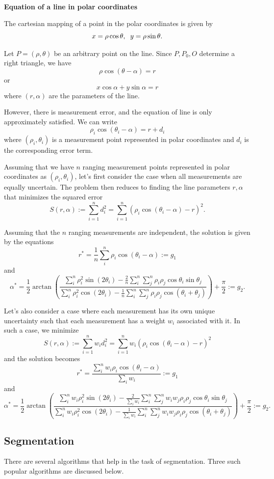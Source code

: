 \documentclass[twoside]{article}
\begin{document}
\textbf{Equation of a line in polar coordinates}

The cartesian mapping of a point in the polar coordinates is given by
$$x = \rho \cos \theta, \hspace{2mm} y = \rho \sin \theta.$$

Let $P = (\rho, \theta)$ be an arbitrary point on the line. Since $P, P_0, O$ determine a right triangle, we have
$$\rho \cos(\theta - \alpha) = r$$
or
$$x \cos \alpha + y \sin \alpha = r$$
where $(r,\alpha)$ are the parameters of the line.

However, there is measurement error, and the equation of line is only approximately satisfied. We can write
$$\rho_i \cos(\theta_i - \alpha) = r + d_i$$
where $(\rho_i, \theta_i)$ is a measurement point represented in polar coordinates and $d_i$ is the corresponding error term.

Assuming that we have $n$ ranging measurement points represented in polar coordinates as $(\rho_i, \theta_i)$, let's first consider the case when all measurements are equally uncertain. The problem then reduces to finding the line parameters $r,\alpha$ that minimizes the squared error
$$S(r,\alpha) := \sum_{i=1}^n d_i^2 = \sum_{i=1}^n(\rho_i \cos(\theta_i - \alpha) - r)^2.$$

Assuming that the $n$ ranging measurements are independent, the solution is given by the equations
$$r^* = \frac{1}{n}\sum_i^n \rho_i\cos(\theta_i - \alpha) := g_1$$ and
$$\alpha^* = \frac{1}{2} \arctan\left(\frac{\sum_i^n \rho_i^2\sin(2\theta_i) - \frac{2}{n}\sum_i^n\sum_j^n \rho_i \rho_j \cos\theta_i \sin \theta_j}{\sum_i^n \rho_i^2\cos(2\theta_i) - \frac{1}{n}\sum_i^n\sum_j^n \rho_i \rho_j \cos(\theta_i + \theta_j)}\right) + \frac{\pi}{2} := g_2.$$

Let's also consider a case where each measurement has its own unique uncertainty such that each measurement has a weight $w_i$ associated with it. In such a case, we minimize
$$S(r,\alpha) := \sum_{i=1}^n w_id_i^2 = \sum_{i=1}^n w_i(\rho_i \cos(\theta_i - \alpha) - r)^2$$
and the solution becomes \cite{SNS}
$$r^* = \frac{\sum_i^n w_i \rho_i\cos(\theta_i - \alpha)}{\sum_i w_i} := g_1$$ and
$$\alpha^* = \frac{1}{2} \arctan\left(\frac{\sum_i^n w_i \rho_i^2\sin(2\theta_i) - \frac{2}{\sum_i w_i}\sum_i^n\sum_j^n w_i w_j\rho_i \rho_j \cos\theta_i \sin \theta_j}{\sum_i^n w_i \rho_i^2\cos(2\theta_i) - \frac{1}{\sum_i w_i}\sum_i^n\sum_j^n w_i w_j \rho_i \rho_j \cos(\theta_i + \theta_j)}\right) + \frac{\pi}{2} := g_2.$$

\subsection{Segmentation}
There are several algorithms that help in the task of segmentation. Three such popular algorithms are discussed below.
\end{document}
